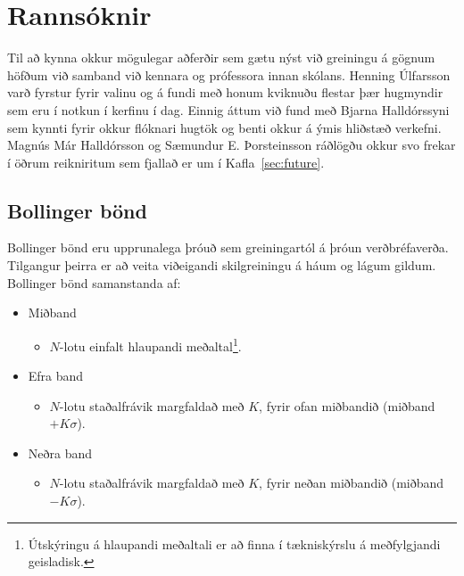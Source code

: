 \documentclass{article}
\begin{document}
\newpage


\section{Rannsóknir}
\label{sec:research}
Til að kynna okkur mögulegar aðferðir sem gætu nýst við greiningu á gögnum
höfðum við samband við kennara og prófessora innan skólans. Henning Úlfarsson
varð fyrstur fyrir valinu og á fundi með honum kviknuðu flestar þær hugmyndir sem eru
í notkun í kerfinu í dag. Einnig áttum við fund með Bjarna Halldórssyni sem
kynnti fyrir okkur flóknari hugtök og benti okkur á ýmis hliðstæð verkefni.
Magnús Már Halldórsson og Sæmundur E. Þorsteinsson ráðlögðu okkur svo frekar í
öðrum reikniritum sem fjallað er um í Kafla~\ref{sec:future}.



\subsection{Bollinger bönd}
\label{sec:research_bollinger_bands}

Bollinger bönd eru upprunalega þróuð sem greiningartól
á þróun verðbréfaverða. 
Tilgangur þeirra er að veita viðeigandi skilgreiningu á háum og lágum gildum.
 \\

Bollinger bönd samanstanda af:

\begin{itemize}
    \item Miðband
      \begin{itemize}
       \item $N$-lotu einfalt hlaupandi meðaltal\footnote[1]{Útskýringu á
	    hlaupandi meðaltali er að finna í tækniskýrslu á meðfylgjandi geisladisk.}.
      \end{itemize}
    \item Efra band
      \begin{itemize}
       \item  $N$-lotu staðalfrávik margfaldað með $K$, fyrir ofan
	      miðbandið (miðband$+ K\sigma$).
      \end{itemize}
    \item Neðra band
      \begin{itemize}
       \item  $N$-lotu staðalfrávik margfaldað með $K$, fyrir neðan
	      miðbandið (miðband$- K\sigma$).
      \end{itemize}

\end{itemize}
\end{document}
